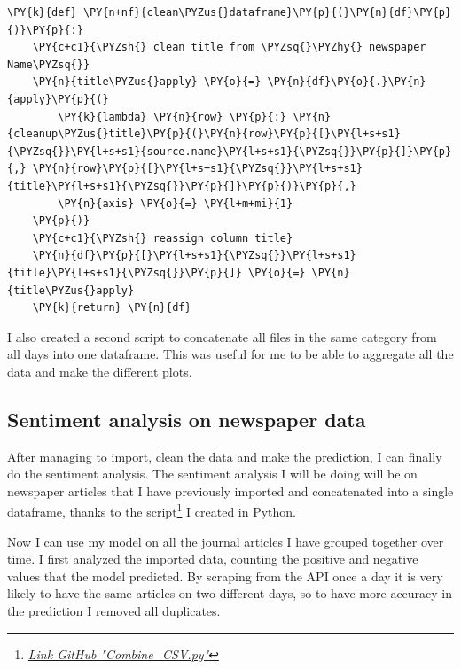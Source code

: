     \begin{tcolorbox}[breakable, size=fbox, boxrule=1pt, pad at break*=1mm,colback=cellbackground, colframe=cellborder]
\begin{Verbatim}[commandchars=\\\{\},fontsize=\footnotesize]
\PY{k}{def} \PY{n+nf}{clean\PYZus{}dataframe}\PY{p}{(}\PY{n}{df}\PY{p}{)}\PY{p}{:}
    \PY{c+c1}{\PYZsh{} clean title from \PYZsq{}\PYZhy{} newspaper Name\PYZsq{}}
    \PY{n}{title\PYZus{}apply} \PY{o}{=} \PY{n}{df}\PY{o}{.}\PY{n}{apply}\PY{p}{(}
        \PY{k}{lambda} \PY{n}{row} \PY{p}{:} \PY{n}{cleanup\PYZus{}title}\PY{p}{(}\PY{n}{row}\PY{p}{[}\PY{l+s+s1}{\PYZsq{}}\PY{l+s+s1}{source.name}\PY{l+s+s1}{\PYZsq{}}\PY{p}{]}\PY{p}{,} \PY{n}{row}\PY{p}{[}\PY{l+s+s1}{\PYZsq{}}\PY{l+s+s1}{title}\PY{l+s+s1}{\PYZsq{}}\PY{p}{]}\PY{p}{)}\PY{p}{,}
        \PY{n}{axis} \PY{o}{=} \PY{l+m+mi}{1}
    \PY{p}{)}
    \PY{c+c1}{\PYZsh{} reassign column title}
    \PY{n}{df}\PY{p}{[}\PY{l+s+s1}{\PYZsq{}}\PY{l+s+s1}{title}\PY{l+s+s1}{\PYZsq{}}\PY{p}{]} \PY{o}{=} \PY{n}{title\PYZus{}apply}
    \PY{k}{return} \PY{n}{df}
\end{Verbatim}
\end{tcolorbox}

I also created a second script to concatenate all files in the same category from all days into one dataframe.
This was useful for me to be able to aggregate all the data and make the different plots. 

\subsection{Sentiment analysis on newspaper data}
\label{chap:model plot}
After managing to import, clean the data and make the prediction, I can finally do the sentiment analysis.
The sentiment analysis I will be doing will be on newspaper articles that I have previously imported and concatenated into a single dataframe, thanks to the script\footnote{\href{https://github.com/bak89/Sentiment-Analysis-on-Swiss-Newspapers/blob/main/Project\%20source/database_newspaper/Combine_CSV.py}{\emph{Link GitHub "Combine\_CSV.py"}}} I created in Python.

Now I can use my model on all the journal articles I have grouped together over time. 
I first analyzed the imported data, counting the positive and negative values that the model predicted.
By scraping from the API once a day it is very likely to have the same articles on two different days, so to have more \gls{accuracy} in the prediction I removed all duplicates.

